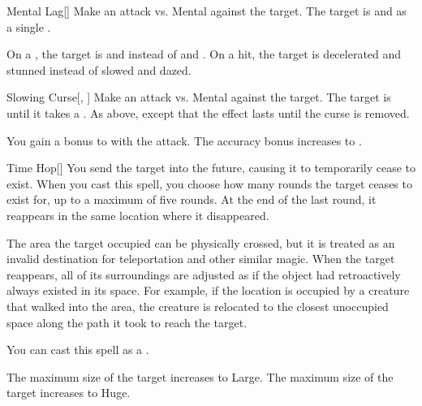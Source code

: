 \lowercase{\hypertarget{spell:Mental Lag}{}}\label{spell:Mental Lag}
\begin{freeability}[Rank 3]{\hypertarget{spell:Mental Lag}{Mental Lag}}[]
Make an attack vs. Mental against the target.
\hit The target is  and  as a single .

\rankline
{} On a , the target is  and  instead of  and .
 On a hit, the target is decelerated and stunned instead of slowed and dazed.
\end{freeability}
\vspace{0.25em}



\lowercase{\hypertarget{spell:Slowing Curse}{}}\label{spell:Slowing Curse}
\begin{freeability}[Rank 3]{\hypertarget{spell:Slowing Curse}{Slowing Curse}}[, ]
Make an attack vs. Mental against the target.
\hit The target is  until it takes a .
\crit As above, except that the effect lasts until the curse is removed.

\rankline
{} You gain a  bonus to  with the attack.
 The accuracy bonus increases to .
\end{freeability}
\vspace{0.25em}



\lowercase{\hypertarget{spell:Time Hop}{}}\label{spell:Time Hop}
\begin{freeability}[Rank 3]{\hypertarget{spell:Time Hop}{Time Hop}}[]
You send the target into the future, causing it to temporarily cease to exist.
When you cast this spell, you choose how many rounds the target ceases to exist for, up to a maximum of five rounds.
At the end of the last round, it reappears in the same location where it disappeared.

The area the target occupied can be physically crossed, but it is treated as an invalid destination for teleportation and other similar magic.
When the target reappears, all of its surroundings are adjusted as if the object had retroactively always existed in its space.
For example, if the location is occupied by a creature that walked into the area, the creature is relocated to the closest unoccupied space along the path it took to reach the target.

You can cast this spell as a .

\rankline
{} The maximum size of the target increases to Large.
 The maximum size of the target increases to Huge.
\end{freeability}
\vspace{0.25em}



